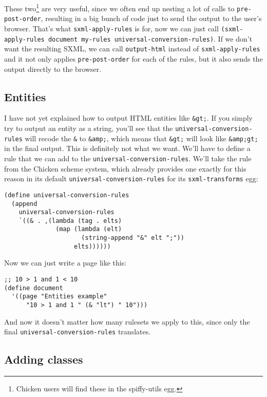 \documentclass{article}
\begin{document}
These two\footnote{Chicken users will find these in the spiffy-utils
  egg.} are very useful, since we often end up nesting a lot of calls
to \verb|pre-post-order|, resulting in a big bunch of code just to
send the output to the user's browser.  That's what
\verb|sxml-apply-rules| is for, now we can just call
\verb|(sxml-apply-rules document my-rules universal-conversion-rules)|.
If we don't want the resulting SXML, we
can call \verb|output-html| instead of \verb|sxml-apply-rules| and it
not only applies \verb|pre-post-order| for each of the rules, but it
also sends the output directly to the browser.

\subsection{Entities}

I have not yet explained how to output HTML entities like
\verb|&gt;|.  If you simply try to output an entity as a string,
you'll see that the \verb|universal-conversion-rules| will recode the
\verb|&| to \verb|&amp;|, which means that \verb|&gt;| will look like
\verb|&amp;gt;| in the final output.  This is definitely not what we
want.  We'll have to define a rule that we can add to the
\verb|universal-conversion-rules|.  We'll take the rule from the
Chicken scheme system, which already provides one exactly for this
reason in its default \verb|universal-conversion-rules| for its
\verb|sxml-transforms| egg:

\begin{verbatim}
(define universal-conversion-rules
  (append
    universal-conversion-rules
    `((& . ,(lambda (tag . elts)
              (map (lambda (elt)
                     (string-append "&" elt ";"))
                   elts))))))
\end{verbatim}

Now we can just write a page like this:

\begin{verbatim}
;; 10 > 1 and 1 < 10
(define document
  '((page "Entities example"
      "10 > 1 and 1 " (& "lt") " 10")))
\end{verbatim}

And now it doesn't matter how many rulesets we apply to this, since
only the final \verb|universal-conversion-rules| translates.

\subsection{Adding classes}
\end{document}
